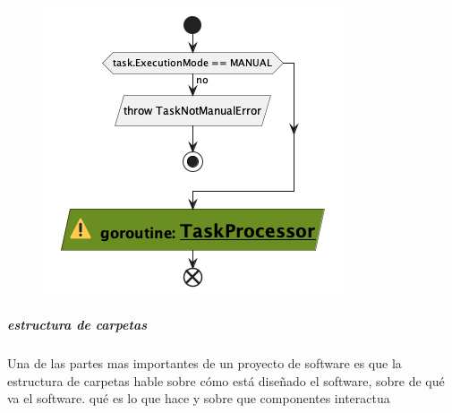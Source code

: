 \begin{figure}[H]
    \centering
    \includegraphics[height=0.3\textheight]{./part/Proyecto_ejecutivo/memoria_descriptiva/descripcionDelProyecto/manager/uml/1-executeTaskManual}
    \caption[Diagrama de objetos de dominio]{}\label{fig:1-executeTaskManual}
\end{figure}

\subparagraph{estructura de carpetas}

Una de las partes mas importantes de un proyecto de software es que la estructura de carpetas hable sobre cómo está diseñado el software, sobre de qué va el software. qué es lo que hace y sobre que componentes interactua



